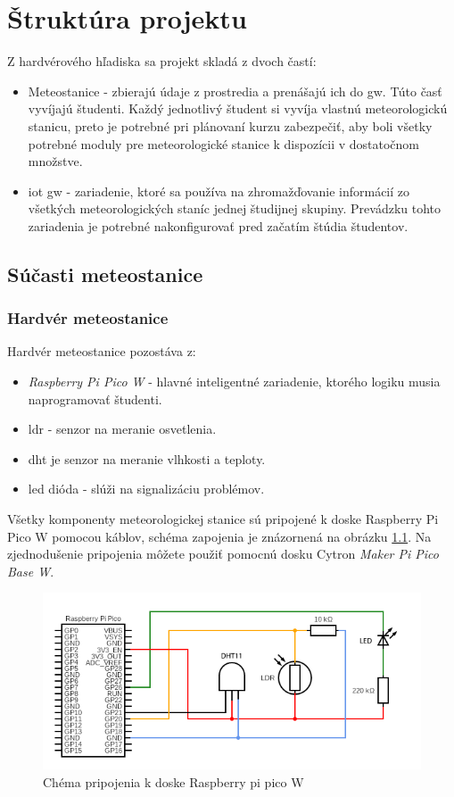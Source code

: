 
\chapter{Štruktúra projektu}
Z hardvérového hľadiska sa projekt skladá z dvoch častí:

\begin{itemize}
    \item Meteostanice - zbierajú údaje z prostredia a prenášajú ich do \gls{gw}. Túto časť vyvíjajú študenti. Každý jednotlivý študent si vyvíja vlastnú meteorologickú stanicu, preto je potrebné pri plánovaní kurzu zabezpečiť, aby boli všetky potrebné moduly pre meteorologické stanice k dispozícii v dostatočnom množstve.
    \item \gls{iot} \gls{gw} - zariadenie, ktoré sa používa na zhromažďovanie informácií zo všetkých meteorologických staníc jednej študijnej skupiny. Prevádzku tohto zariadenia je potrebné nakonfigurovať pred začatím štúdia študentov.
\end{itemize}

\section{Súčasti meteostanice}
\subsection{Hardvér meteostanice}
Hardvér meteostanice pozostáva z:
\begin{itemize}
    \item \textit{Raspberry Pi Pico W} - hlavné inteligentné zariadenie, ktorého logiku musia naprogramovať študenti.
    \item \gls{ldr} - senzor na meranie osvetlenia.
    \item \gls{dht} je senzor na meranie vlhkosti a teploty.
    \item \gls{led} dióda - slúži na signalizáciu problémov.
\end{itemize}
Všetky komponenty meteorologickej stanice sú pripojené k doske Raspberry Pi Pico W pomocou káblov, schéma zapojenia je znázornená na obrázku \ref{schema1}. Na zjednodušenie pripojenia môžete použiť pomocnú dosku Cytron \textit{Maker Pi Pico Base W}.

\begin{figure}[!ht]
    \centering
    \includegraphics[width=\textwidth]{figures/circuit}
    \caption{Chéma pripojenia k doske Raspberry pi pico W \label{schema1}}
\end{figure}

